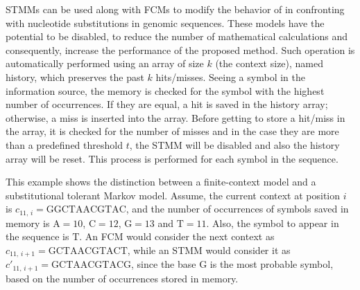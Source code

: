 STMMs can be used along with FCMs to modify the behavior of \smashpp in confronting with nucleotide substitutions in genomic sequences. These models have the potential to be disabled, to reduce the number of mathematical calculations and consequently, increase the performance of the proposed method. Such operation is automatically performed using an array of size $k$ (the context size), named history, which preserves the past $k$ hits/misses. Seeing a symbol in the information source, the memory is checked for the symbol with the highest number of occurrences. If they are equal, a hit is saved in the history array; otherwise, a miss is inserted into the array. Before getting to store a hit/miss in the array, it is checked for the number of misses and in the case they are more than a predefined threshold $t$, the STMM will be disabled and also the history array will be reset. This process is performed for each symbol in the sequence.

This example shows the distinction between a finite-context model and a substitutional tolerant Markov model. Assume, the current context at position $i$ is $c_{11,\,i}=\textrm{GGCTAACGTAC}$, and the number of occurrences of symbols saved in memory is $\textrm{A}=10$, $\textrm{C}=12$, $\textrm{G}=13$ and $\textrm{T}=11$. Also, the symbol to appear in the sequence is $\textrm{T}$. An FCM would consider the next context as $c_{11,\,i+1}=\textrm{GCTAACGTACT}$, while an STMM would consider it as ${c'}_{11,\,i+1}=\textrm{GCTAACGTACG}$, since the base $\textrm{G}$ is the most probable symbol, based on the number of occurrences stored in memory.

